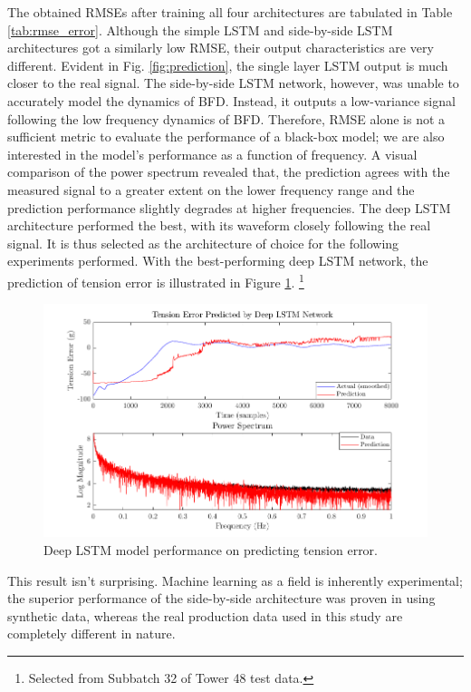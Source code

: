 The obtained RMSEs after training all four architectures are tabulated in Table \ref{tab:rmse_error}. Although the simple LSTM and side-by-side LSTM architectures got a similarly low RMSE, their output characteristics are very different. Evident in Fig. \ref{fig:prediction}, the single layer LSTM output is much closer to the real signal. The side-by-side LSTM network, however, was unable to accurately model the dynamics of BFD. Instead, it outputs a low-variance signal following the low frequency dynamics of BFD. Therefore, RMSE alone is not a sufficient metric to evaluate the performance of a black-box model; we are also interested in the model's performance as a function of frequency. A visual comparison of the power spectrum revealed that, the prediction agrees with the measured signal to a greater extent on the lower frequency range and the prediction performance slightly degrades at higher frequencies. The deep LSTM architecture performed the best, with its waveform closely following the real signal. It is thus selected as the architecture of choice for the following experiments performed. With the best-performing deep LSTM network, the prediction of tension error is illustrated in Figure \ref{fig:tension}. \footnote{Selected from Subbatch 32 of Tower 48 test data.}

\begin{figure}
    \centering
    \includegraphics[width=\textwidth]{figures/tension.png}
    \caption{Deep LSTM model performance on predicting tension error. }
    \label{fig:tension}
\end{figure}

This result isn't surprising. Machine learning as a field is inherently experimental; the superior performance of the side-by-side architecture was proven in \cite{gonzalez} using synthetic data, whereas the real production data used in this study are completely different in nature. 

